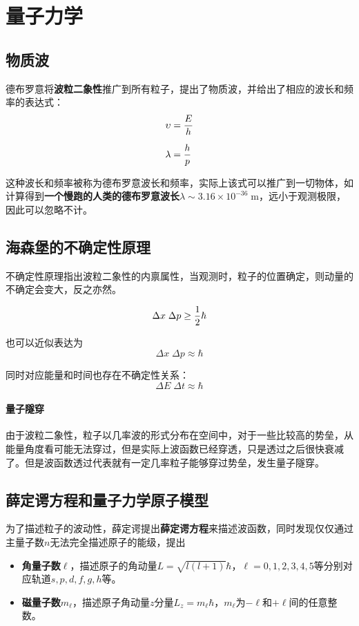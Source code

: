 \documentclass[openany]{ctexbook}
\begin{document}
\section{量子力学}
\subsection{物质波}
德布罗意将\textbf{波粒二象性}推广到所有粒子，提出了物质波，并给出了相应的波长和频率的表达式：
\begin{align}
  \upsilon &= {E\over h}\\[2mm]
  \lambda &= {h\over p}
\end{align}

这种波长和频率被称为德布罗意波长和频率，实际上该式可以推广到一切物体，如计算得到\textbf{一个慢跑的人类的德布罗意波长}$\lambda\sim3.16\times10^{-36}\;\mathrm m$，远小于观测极限，因此可以忽略不计。

\subsection{海森堡的不确定性原理}\label{uncertainty}
不确定性原理指出波粒二象性的内禀属性，当观测时，粒子的位置确定，则动量的不确定会变大，反之亦然。

\begin{equation}
  \Delta x \;\Delta p\geq{1\over2}\hbar
\end{equation}

也可以近似表达为
\begin{equation}
  \Delta x \;\Delta p\approx \hbar
\end{equation}

同时对应能量和时间也存在不确定性关系：
\begin{equation}
  \Delta E \;\Delta t\approx \hbar
\end{equation}

\paragraph{量子隧穿}
由于波粒二象性，粒子以几率波的形式分布在空间中，对于一些比较高的势垒，从能量角度看可能无法穿过，但是实际上波函数已经穿透，只是透过之后很快衰减了。但是波函数透过代表就有一定几率粒子能够穿过势垒，发生量子隧穿。

\subsection{薛定谔方程和量子力学原子模型}
为了描述粒子的波动性，薛定谔提出\textbf{薛定谔方程}来描述波函数，同时发现仅仅通过主量子数$n$无法完全描述原子的能级，提出
\begin{itemize}
  \item \textbf{角量子数}$\ell$，描述原子的角动量$L=\sqrt{l(l+1)}\hbar$，$\ell=0,1,2,3,4,5$等分别对应轨道$s,p,d,f,g,h$等。
  \item \textbf{磁量子数}$m_\ell$，描述原子角动量$z$分量$L_z=m_\ell \hbar$，$m_\ell$为$-\ell$和$+\ell$间的任意整数。
\end{itemize}
\end{document}
